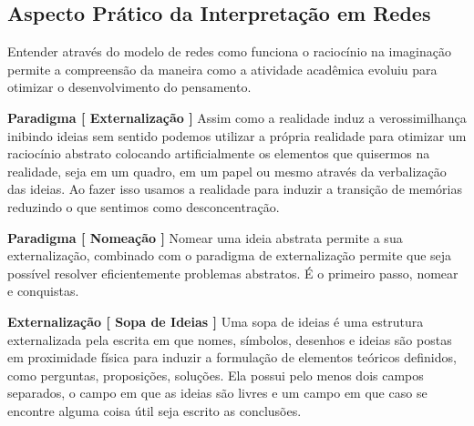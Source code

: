 \documentclass[10pt,a4paper]{report}
\begin{document}
\subsection{Aspecto Prático da Interpretação em Redes}

\hspace{\baselineskip}

Entender através do modelo de redes como funciona o raciocínio na imaginação permite a compreensão da maneira como a atividade acadêmica evoluiu para otimizar o desenvolvimento do pensamento.

\hspace{\baselineskip}

\textbf{Paradigma [ Externalização ]} Assim como a realidade induz a verossimilhança inibindo ideias sem sentido podemos utilizar a própria realidade para otimizar um raciocínio abstrato colocando artificialmente os elementos que quisermos na realidade, seja em um quadro, em um papel ou mesmo através da verbalização das ideias. Ao fazer isso usamos a realidade para induzir a transição de memórias reduzindo o que sentimos como desconcentração.

\hspace{\baselineskip}

\textbf{Paradigma [ Nomeação ]} Nomear uma ideia abstrata permite a sua externalização, combinado com o paradigma de externalização permite que seja possível resolver eficientemente problemas abstratos. É o primeiro passo, nomear e conquistas.

\hspace{\baselineskip}

\textbf{Externalização [ Sopa de Ideias ]} Uma sopa de ideias é uma estrutura externalizada pela escrita em que nomes, símbolos, desenhos e ideias são postas em proximidade física para induzir a formulação de elementos teóricos definidos, como perguntas, proposições, soluções. Ela possui pelo menos dois campos separados, o campo em que as ideias são livres e um campo em que caso se encontre alguma coisa útil seja escrito as conclusões.\\
\end{document}
